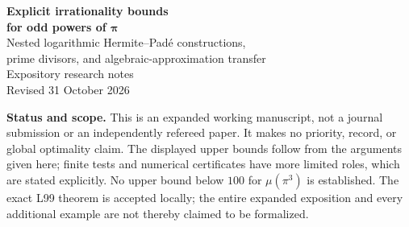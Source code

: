 \documentclass[11pt,a4paper]{article}
\numberwithin{equation}{section}
\theoremstyle{definition}
\theoremstyle{remark}
\newcommand{\ii}{\mathrm{i}}
\newcommand{\LNNbound}{\frac{12970477737}{11706979}}
\begin{document}
\begin{titlepage}
\thispagestyle{empty}
\vspace*{15mm}
\begin{center}
{\LARGE\bfseries Explicit irrationality bounds\\[5pt]
for odd powers of \(\boldsymbol{\pi}\)}\\[9mm]
{\large Nested logarithmic Hermite--Pad\'e constructions,\\
prime divisors, and algebraic-approximation transfer}\\[12mm]
{\large Expository research notes}\\[3mm]
Revised 31 October 2026
\end{center}
\vspace{9mm}
\begin{abstract}
We develop a nested-interval version of a classical logarithmic
Hermite--Pad\'e construction and give explicit upper bounds for the
irrationality exponents of odd powers of \(\pi\). The construction uses
Gaussian-integer polynomials in \(\log\ii=\ii\pi/2\), rather than a
direct sequence of binary linear forms in \(1,\pi^k\).
We prove integrality, an exact nonvanishing determinant identity, a
prime-divisor estimate described by weighted arcs on a circle, and
uniform analytic bounds. A minimal-polynomial resultant argument
handles every rational approximation, including reducible-binomial
and rational-power cases. The latest twenty-eight-layer choice gives
\[
 \boxed{\mu(\pi^3)\le\LNNbound
 =1107.9269670681\ldots<1107.93.}
\]
This fixed result, including the actual auxiliary family and the required
arithmetic and analytic bounds, has an accepted Lean formalization.
The general transfer applies to every integer power \(k\ge2\); further
numerical instances and an explicit all-power recipe are explained with
their separate verification status. We also derive an older all-power
bound from Nesterenko--Waldschmidt and compare the even case with the
specialized bound for \(\zeta(4)\). Background, intermediate calculations,
worked examples, and a guide to the formal proof are included.
\end{abstract}
\vfill
\noindent\textbf{Status and scope.}
This is an expanded working manuscript, not a journal submission or an
independently refereed paper. It makes no priority, record, or global
optimality claim. The displayed upper bounds follow from the arguments
given here; finite tests and numerical certificates have more limited
roles, which are stated explicitly. No upper bound below \(100\) for
\(\mu(\pi^3)\) is established.
The exact L99 theorem is accepted locally; the entire expanded exposition
and every additional example are not thereby claimed to be formalized.
\end{titlepage}
\end{document}
